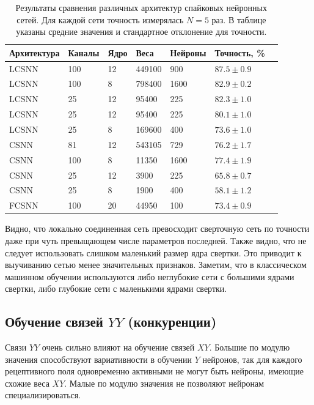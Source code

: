 \documentclass[a4paper]{article}
\begin{document}
\begin{table}[H]
 \caption{Результаты сравнения различных архитектур спайковых нейронных сетей. Для каждой сети точность измерялась $N=5$ раз. В таблице указаны средние значения и стандартное отклонение для точности.}
\begin{center}
\begin{tabular}{|l|l|l|l|l|l|l|}
\hline
Архитектура & Каналы & Ядро & Веса & Нейроны & Точность, \% \\
\hline
{LCSNN} & {100} & {12} & {449100} & {900} & {$87.5 \pm 0.9$}\\
\hline
{LCSNN} & {100} & {8} & {798400} & {1600} & {$82.9 \pm 0.2$}\\
\hline
{LCSNN\footnotemark} & {25} & {12} & {95400} & {225} & {$82.3 \pm 1.0$}\\
\hline
{LCSNN} & {25} & {12} & {95400} & {225} & {$80.1 \pm 1.0$}\\
\hline
{LCSNN} & {25} & {8} & {169600} & {400} & {$73.6 \pm 1.0$}\\
\hline
{CSNN} & {81} & {12} & {543105} & {729} & {$76.2 \pm 1.7$}\\
\hline
{CSNN} & {100} & {8} & {11350} & {1600} & {$77.4 \pm 1.9$}\\
\hline
{CSNN} & {25} & {12} & {3900} & {225} & {$65.8 \pm 0.7$}\\
\hline
{CSNN} & {25} & {8} & {1900} & {400} & {$58.1 \pm 1.2$}\\
\hline
{FCSNN} & {100} & {20} & {44950} & {100} & {$73.4 \pm 0.9$}\\
\hline
\end{tabular}
\end{center}
\end{table}

Видно, что локально соединенная сеть превосходит сверточную сеть по точности даже при чуть превыщающем числе параметров последней. Также видно, что не следует использовать слишком маленький размер ядра свертки. Это приводит к выучиванию сетью менее значительных признаков. Заметим, что в классическом машинном обучении используются либо неглубокие сети с большими ядрами свертки, либо глубокие сети с маленькими ядрами свертки.


\subsection{Обучение связей $YY$ (конкуренции)}
Связи $YY$ очень сильно влияют на обучение связей $XY$. Большие по модулю значения способствуют вариативности в обучении $Y$ нейронов, так для каждого рецептивного поля одновременно активными не могут быть нейроны, имеющие схожие веса $XY$. Малые по модулю значения не позволяют нейронам специализироваться. 
\end{document}
